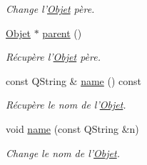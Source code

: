 \begin{DoxyCompactItemize}
\begin{DoxyCompactList}\small\item\em Change l'\hyperlink{class_objet}{Objet} père. \end{DoxyCompactList}\item 
\hyperlink{class_objet}{Objet} $\ast$ \hyperlink{class_objet_aaa3c3290e5bb742363263600fcdb3e5e}{parent} ()
\begin{DoxyCompactList}\small\item\em Récupère l'\hyperlink{class_objet}{Objet} père. \end{DoxyCompactList}\item 
const Q\+String \& \hyperlink{class_objet_a4a702c189bedcbf1e65da6aec72c8e44}{name} () const 
\begin{DoxyCompactList}\small\item\em Récupère le nom de l'\hyperlink{class_objet}{Objet}. \end{DoxyCompactList}\item 
void \hyperlink{class_objet_a9fcc9af481f4e13f46ab7d1b40cf91fc}{name} (const Q\+String \&n)
\begin{DoxyCompactList}\small\item\em Change le nom de l'\hyperlink{class_objet}{Objet}. \end{DoxyCompactList}\end{DoxyCompactItemize}
